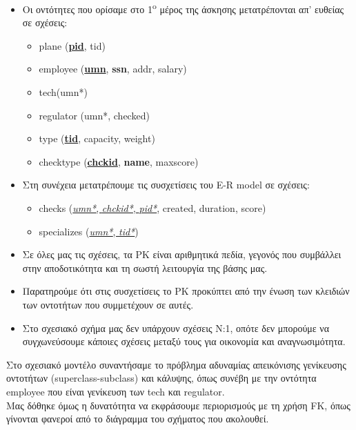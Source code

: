 \documentclass[a4paper]{article}
\begin{document}
\begin{itemize}
\item Οι οντότητες που ορίσαμε στο 1\textsuperscript{o} μέρος της άσκησης
μετατρέπονται απ' ευθείας σε σχέσεις:
\begin{itemize}
\item plane (\underline{\textbf{pid}}, tid)
\item employee (\underline{\textbf{umn}}, \textbf{ssn}, addr, salary)
\tab \item tech(umn*)
\tab \item regulator (umn*, checked)
\item type (\underline{\textbf{tid}}, capacity, weight)
\item checktype (\underline{\textbf{chckid}}, \textbf{name}, maxscore)\\
\end{itemize}

\item Στη συνέχεια μετατρέπουμε τις συσχετίσεις του E-R model σε σχέσεις:
\begin{itemize}
\item checks (\underline{\textit{umn*}, \textit{chckid*}, \textit{pid*}}, created,
duration, score)
\item specializes (\underline{\textit{umn*}, \textit{tid*}})\\

\end{itemize}
\end{itemize}

\begin{itemize}
\renewcommand{\labelitemi}{$\diamondsuit$}
\item Σε όλες μας τις σχέσεις, τα PK είναι αριθμητικά πεδία, γεγονός που
συμβάλλει στην αποδοτικότητα και τη σωστή λειτουργία της βάσης μας.
\item Παρατηρούμε ότι στις συσχετίσεις το PK προκύπτει από την ένωση των
κλειδιών των οντοτήτων που συμμετέχουν σε αυτές.
\item Στο σχεσιακό σχήμα μας δεν υπάρχουν σχέσεις Ν:1, οπότε δεν μπορούμε να
συγχωνεύσουμε κάποιες σχέσεις μεταξύ τους για οικονομία και αναγνωσιμότητα.\\
\renewcommand{\labelitemi}{$\bullet$}
\end{itemize}

Στο σχεσιακό μοντέλο συναντήσαμε το πρόβλημα αδυναμίας απεικόνισης
γενίκευσης οντοτήτων (superclass-subclass) και κάλυψης, όπως συνέβη με την
οντότητα employee που είναι γενίκευση των tech και regulator.\\
Μας δόθηκε όμως η δυνατότητα να εκφράσουμε περιορισμούς με τη χρήση FK, όπως
γίνονται φανεροί από το διάγραμμα του σχήματος που ακολουθεί.\\
\end{document}
